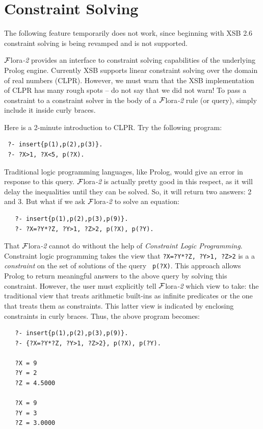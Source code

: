 \documentclass[11pt]{article}
\newcommand{\FLORA}{{\mbox{\sc ${\cal F}${lora}\rm\emph{-2}}}\xspace}
\begin{document}
\section{Constraint Solving}\label{sec-clp}

The following feature temporarily does not work, since beginning with
XSB 2.6 constraint solving is being revamped and is not supported.

\FLORA provides an interface to constraint solving capabilities of the
underlying Prolog engine. Currently XSB supports linear constraint solving
over the domain of real numbers (CLPR). However, we must warn that the XSB
implementation of CLPR has many rough spots -- do not say that we did not
warn! To pass a constraint to a constraint solver in the body of a \FLORA
rule (or query), simply include it inside curly braces.

Here is a 2-minute introduction to CLPR. Try the following program:
\begin{verbatim}
 ?- insert{p(1),p(2),p(3)}.
 ?- ?X>1, ?X<5, p(?X).
\end{verbatim}
Traditional logic programming languages, like Prolog, would give an error
in response to this query. \FLORA is actually pretty good in this respect,
as it will delay the inequalities until they can be solved. So, it will
return two answers: 2 and 3. But what if we ask \FLORA to solve an equation:
\begin{verbatim}
   ?- insert{p(1),p(2),p(3),p(9)}.
   ?- ?X=?Y*?Z, ?Y>1, ?Z>2, p(?X), p(?Y).
\end{verbatim}
That \FLORA cannot do without the help of 
\emph{Constraint Logic Programming}.
Constraint logic programming takes the view that
\texttt{?X=?Y*?Z, ?Y>1, ?Z>2} is a  
a \emph{constraint} on the set of solutions of the query {\tt
  p(?X)}. This approach allows Prolog to return meaningful answers to the
above query by solving this constraint.
However, the user must explicitly tell \FLORA which view
  to take: the traditional view that treats arithmetic built-ins as
  infinite predicates or the one that treats them as constraints.
  This latter view is indicated by enclosing constraints in curly
  braces. Thus, the above program becomes:
\begin{verbatim}
   ?- insert{p(1),p(2),p(3),p(9)}.
   ?- {?X=?Y*?Z, ?Y>1, ?Z>2}, p(?X), p(?Y).
  
   ?X = 9
   ?Y = 2
   ?Z = 4.5000

   ?X = 9
   ?Y = 3
   ?Z = 3.0000
\end{verbatim}
\end{document}
